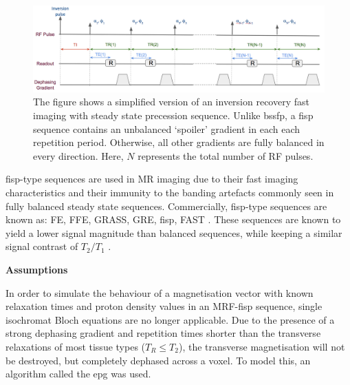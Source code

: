 \begin{figure}[ht]
    \centering
    \includegraphics[angle=0,width=1\textwidth, keepaspectratio]{images/mrf/sequenceFISP}
    \caption{The figure shows a simplified version of an inversion recovery fast imaging with steady state precession sequence. 
    Unlike \ac{bssfp}, a \ac{fisp} sequence contains an unbalanced `spoiler' gradient in each each repetition period.
    Otherwise, all other gradients are fully balanced in every direction.
    Here, $N$ represents the total number of RF pulses.}
    \label{fig:sequenceFISP}
\end{figure}

\hfill

\ac{fisp}-type sequences are used in MR imaging due to their fast imaging characteristics and their immunity to the banding artefacts commonly seen in fully balanced steady state sequences. 
Commercially, \ac{fisp}-type sequences are known as: FE, FFE, GRASS, GRE, \ac{fisp}, FAST \cite{Hargreaves2012}.
These sequences are known to yield a lower signal magnitude than balanced sequences, while keeping a similar signal contrast of $T_2/T_1$ \cite{Hargreaves2012}.

\hfill

\large \textbf{Assumptions} \normalsize

In order to simulate the behaviour of a magnetisation vector with known relaxation times and proton density values in an MRF-\ac{fisp} sequence, single isochromat Bloch equations are no longer applicable.
Due to the presence of a strong dephasing gradient and repetition times shorter than the transverse relaxations of most tissue types \big($T_R \leq T_2$\big), the transverse magnetisation will not be destroyed, but completely dephased across a voxel.
To model this, an algorithm called the \ac{epg} \cite{Hennig1988} \cite{Hennig1991} was used.

\hfill 

